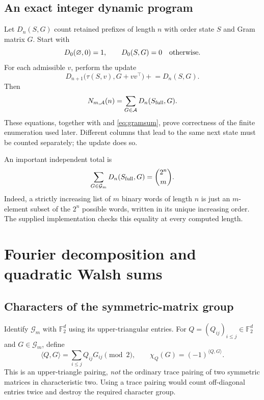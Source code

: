 \documentclass[11pt,letterpaper]{article}
\theoremstyle{definition}
\newcommand{\F}{\mathbb F_2}
\newcommand{\1}{\mathbf 1}
\newcommand{\ip}[2]{\langle #1,#2\rangle}
\begin{document}
\subsection{An exact integer dynamic program}
Let $D_n(S,G)$ count retained prefixes of length $n$ with order state $S$ and
Gram matrix $G$. Start with
\begin{equation}\label{eq:dpinitial}
 D_0(\varnothing,0)=1,
 \qquad D_0(S,G)=0\quad\hbox{otherwise}.
\end{equation}
For each admissible $v$, perform the update
\begin{equation}\label{eq:dp}
 D_{n+1}\bigl(\tau(S,v),G+vv^\top\bigr)
 \mathrel{+}=D_n(S,G).
\end{equation}
Then
\begin{equation}\label{eq:dpend}
 N_{m,\mathcal A}(n)=\sum_{G\in\mathcal A}D_n(S_{\rm full},G).
\end{equation}
These equations, together with  and \eqref{eq:gramsum}, prove
correctness of the finite enumeration used later. Different columns that lead
to the same next state must be counted separately; the update does so.

An important independent total is
\begin{equation}\label{eq:unrestricted}
 \sum_{G\in\mathcal G_m}D_n(S_{\rm full},G)=\binom{2^n}{m}.
\end{equation}
Indeed, a strictly increasing list of $m$ binary words of length $n$ is just an
$m$-element subset of the $2^n$ possible words, written in its unique increasing
order. The supplied implementation checks this equality at every computed
length.

\section{Fourier decomposition and quadratic Walsh sums}
\label{sec:fourier}

\subsection{Characters of the symmetric-matrix group}
Identify $\mathcal G_m$ with $\F^d$ using its upper-triangular entries. For
$Q=(Q_{ij})_{i\le j}\in\F^d$ and $G\in\mathcal G_m$, define
\begin{equation}\label{eq:pairing}
 \ip{Q}{G}=\sum_{i\le j}Q_{ij}G_{ij}\pmod2,
 \qquad \chi_Q(G)=(-1)^{\ip{Q}{G}}.
\end{equation}
This is an upper-triangle pairing, \emph{not} the ordinary trace pairing of two
symmetric matrices in characteristic two. Using a trace pairing would count
off-diagonal entries twice and destroy the required character group.
\end{document}
